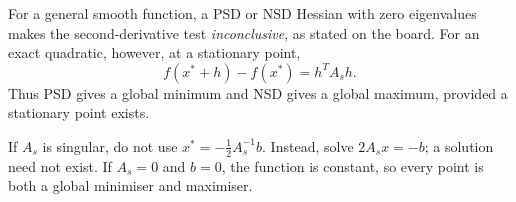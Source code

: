 \begin{remark}
    For a general smooth function, a PSD or NSD Hessian with zero eigenvalues makes the second-derivative test \emph{inconclusive}, as stated on the board. For an exact quadratic, however, at a stationary point,
    \[
        f(x^*+h)-f(x^*)=h^TA_sh.
    \]
    Thus PSD gives a global minimum and NSD gives a global maximum, provided a stationary point exists.

    If $A_s$ is singular, do not use $x^*=-\tfrac12 A_s^{-1}b$. Instead, solve $2A_sx=-b$; a solution need not exist. If $A_s=0$ and $b=0$, the function is constant, so every point is both a global minimiser and maximiser.
\end{remark}